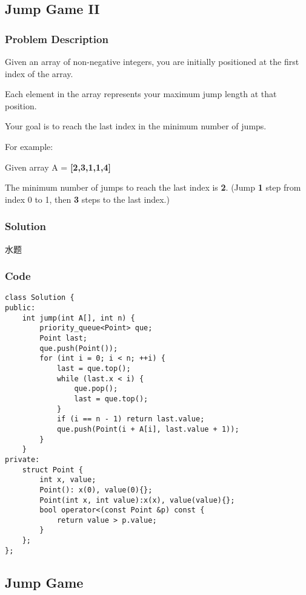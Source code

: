 \documentclass[courier]{article}
\begin{document}
\begin{CJK*}{UTF8}{gkai}
\subsection{ Jump Game II }

\subsubsection*{Problem Description}
Given an array of non-negative integers, you are initially positioned at the first index of the array.

Each element in the array represents your maximum jump length at that position.

Your goal is to reach the last index in the minimum number of jumps.

For example:


Given array A = \textbf{[2,3,1,1,4]}

The minimum number of jumps to reach the last index is \textbf{2}. (Jump \textbf{1} step from index 0 to 1, then \textbf{3} steps to the last index.)



\subsubsection*{Solution}
水题

\subsubsection*{Code}
\begin{lstlisting}
class Solution {
public:
    int jump(int A[], int n) {
        priority_queue<Point> que;
        Point last;
        que.push(Point());
        for (int i = 0; i < n; ++i) {
            last = que.top();
            while (last.x < i) {
                que.pop();
                last = que.top();
            }
            if (i == n - 1) return last.value;
            que.push(Point(i + A[i], last.value + 1));
        }
    }
private:
    struct Point {
        int x, value;
        Point(): x(0), value(0){};
        Point(int x, int value):x(x), value(value){};
        bool operator<(const Point &p) const {
            return value > p.value;
        }
    };
}; 
\end{lstlisting}


\subsection{ Jump Game }


\end{CJK*}
\end{document}
